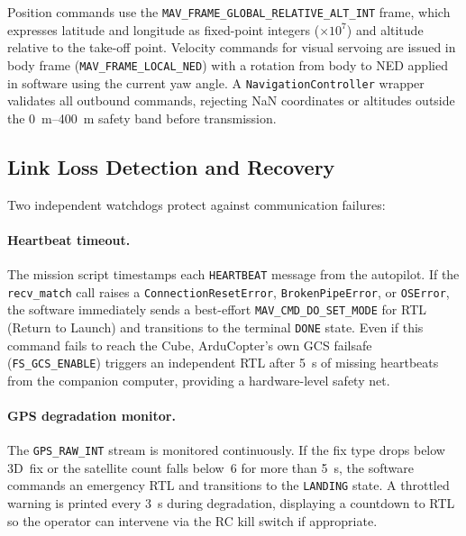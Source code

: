 Position commands use the \texttt{MAV\_FRAME\_GLOBAL\_RELATIVE\_ALT\_INT} frame, which expresses latitude and longitude as fixed-point integers ($\times 10^7$) and altitude relative to the take-off point. Velocity commands for visual servoing are issued in body frame (\texttt{MAV\_FRAME\_LOCAL\_NED}) with a rotation from body to NED applied in software using the current yaw angle. A \texttt{NavigationController} wrapper validates all outbound commands, rejecting NaN coordinates or altitudes outside the \SIrange{0}{400}{\metre} safety band before transmission.

\subsection{Link Loss Detection and Recovery}\label{sec:link-loss}

Two independent watchdogs protect against communication failures:

\paragraph{Heartbeat timeout.} The mission script timestamps each \texttt{HEARTBEAT} message from the autopilot. If the \texttt{recv\_match} call raises a \texttt{ConnectionResetError}, \texttt{BrokenPipeError}, or \texttt{OSError}, the software immediately sends a best-effort \texttt{MAV\_CMD\_DO\_SET\_MODE} for RTL (Return to Launch) and transitions to the terminal \texttt{DONE} state. Even if this command fails to reach the Cube, ArduCopter's own GCS failsafe (\texttt{FS\_GCS\_ENABLE}) triggers an independent RTL after \SI{5}{\second} of missing heartbeats from the companion computer, providing a hardware-level safety net.

\paragraph{GPS degradation monitor.} The \texttt{GPS\_RAW\_INT} stream is monitored continuously. If the fix type drops below 3D~fix or the satellite count falls below~6 for more than \SI{5}{\second}, the software commands an emergency RTL and transitions to the \texttt{LANDING} state. A throttled warning is printed every \SI{3}{\second} during degradation, displaying a countdown to RTL so the operator can intervene via the RC kill switch if appropriate.

